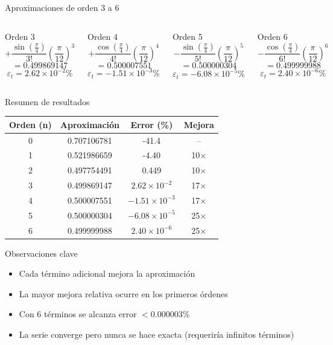 \documentclass[main.tex]{subfiles}
\begin{document}
\begin{frame}{Aproximaciones de orden 3 a 6}
\begin{columns}[T]
\begin{block}{Orden 3}
\[ +\frac{\sin\left(\frac{\pi}{4}\right)}{3!}\left(\frac{\pi}{12}\right)^3 \]
\[ = 0.499869147 \]
\[ \varepsilon_t = 2.62 \times 10^{-2}\% \]
\end{block}

\begin{block}{Orden 4}
\[ +\frac{\cos\left(\frac{\pi}{4}\right)}{4!}\left(\frac{\pi}{12}\right)^4 \]
\[ = 0.500007551 \]
\[ \varepsilon_t = -1.51 \times 10^{-3}\% \]
\end{block}

\begin{block}{Orden 5}
\[ -\frac{\sin\left(\frac{\pi}{4}\right)}{5!}\left(\frac{\pi}{12}\right)^5 \]
\[ = 0.500000304 \]
\[ \varepsilon_t = -6.08 \times 10^{-5}\% \]
\end{block}

\begin{block}{Orden 6}
\[ -\frac{\cos\left(\frac{\pi}{4}\right)}{6!}\left(\frac{\pi}{12}\right)^6 \]
\[ = 0.499999988 \]
\[ \varepsilon_t = 2.40 \times 10^{-6}\% \]
\end{block}
\end{columns}
\end{frame}

\begin{frame}{Resumen de resultados}
\centering
\footnotesize
\begin{tabular}{cccc}
\toprule
\textbf{Orden (n)} & \textbf{Aproximación} & \textbf{Error (\%)} & \textbf{Mejora} \\
\midrule
0 & 0.707106781 & -41.4 & -- \\
1 & 0.521986659 & -4.40 & 10$\times$ \\
2 & 0.497754491 & 0.449 & 10$\times$ \\
3 & 0.499869147 & $2.62 \times 10^{-2}$ & 17$\times$ \\
4 & 0.500007551 & $-1.51 \times 10^{-3}$ & 17$\times$ \\
5 & 0.500000304 & $-6.08 \times 10^{-5}$ & 25$\times$ \\
6 & 0.499999988 & $2.40 \times 10^{-6}$ & 25$\times$ \\
\bottomrule
\end{tabular}

\begin{block}{Observaciones clave}
\begin{itemize}
\item Cada término adicional mejora la aproximación
\item La mayor mejora relativa ocurre en los primeros órdenes
\item Con 6 términos se alcanza error $< 0.000003\%$
\item La serie converge pero nunca se hace exacta (requeriría infinitos términos)
\end{itemize}
\end{block}
\end{frame}
\end{document}
